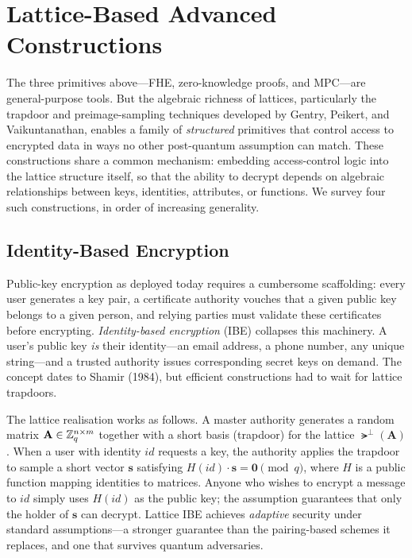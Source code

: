 \section{Lattice-Based Advanced Constructions}
\label{sec:lattice-advanced}

The three primitives above---FHE, zero-knowledge proofs, and MPC---are general-purpose tools.  But the algebraic richness of lattices, particularly the trapdoor and preimage-sampling techniques developed by Gentry, Peikert, and Vaikuntanathan, enables a family of \emph{structured} primitives that control access to encrypted data in ways no other post-quantum assumption can match.  These constructions share a common mechanism: embedding access-control logic into the lattice structure itself, so that the ability to decrypt depends on algebraic relationships between keys, identities, attributes, or functions.  We survey four such constructions, in order of increasing generality.


\subsection{Identity-Based Encryption}
\label{subsec:ibe}

Public-key encryption as deployed today requires a cumbersome scaffolding: every user generates a key pair, a certificate authority vouches that a given public key belongs to a given person, and relying parties must validate these certificates before encrypting.  \emph{Identity-based encryption} (IBE) collapses this machinery.  A user's public key \emph{is} their identity---an email address, a phone number, any unique string---and a trusted authority issues corresponding secret keys on demand.  The concept dates to Shamir (1984), but efficient constructions had to wait for lattice trapdoors.

The lattice realisation works as follows.  A master authority generates a random matrix $\mathbf{A} \in \mathbb{Z}_q^{n \times m}$ together with a short basis (trapdoor) for the lattice $\lat^\perp(\mathbf{A})$.  When a user with identity $\mathit{id}$ requests a key, the authority applies the trapdoor to sample a short vector $\mathbf{s}$ satisfying $H(\mathit{id}) \cdot \mathbf{s} = \mathbf{0} \pmod{q}$, where $H$ is a public function mapping identities to matrices.  Anyone who wishes to encrypt a message to $\mathit{id}$ simply uses $H(\mathit{id})$ as the public key; the \lwe{} assumption guarantees that only the holder of $\mathbf{s}$ can decrypt.  Lattice IBE achieves \emph{adaptive} security under standard \lwe{} assumptions---a stronger guarantee than the pairing-based schemes it replaces, and one that survives quantum adversaries.


